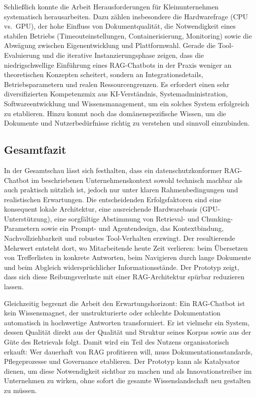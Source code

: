 Schließlich konnte die Arbeit Herausforderungen für Kleinunternehmen systematisch herausarbeiten.
Dazu zählen insbesondere die Hardwarefrage (CPU vs.\ GPU), der hohe Einfluss von Dokumentqualität, die Notwendigkeit eines stabilen Betriebs (Timeouteinstellungen, Containerisierung, Monitoring) sowie die Abwägung zwischen Eigenentwicklung und Plattformwahl.
Gerade die Tool-Evaluierung und die iterative Instanzierungsphase zeigen, dass die \glqq niedrigschwellige\grqq{} Einführung eines RAG-Chatbots in der Praxis weniger an theoretischen Konzepten scheitert, sondern an Integrationsdetails, Betriebsparametern und realen Ressourcengrenzen.
Es erfordert einen sehr diversifizierten Kompetenzmix aus KI-Verständnis, Systemadministration, Softwareentwicklung und Wissensmanagement, um ein solches System erfolgreich zu etablieren.
Hinzu kommt noch das domänenspezifische Wissen, um die Dokumente und Nutzerbedürfnisse richtig zu verstehen und sinnvoll einzubinden.

\subsection{Gesamtfazit}\label{subsec:gesamtfazit}

In der Gesamtschau lässt sich festhalten, dass ein datenschutzkonformer RAG-Chatbot im beschriebenen Unternehmenskontext sowohl technisch machbar als auch praktisch nützlich ist, jedoch nur unter klaren Rahmenbedingungen und realistischen Erwartungen.
Die entscheidenden Erfolgsfaktoren sind eine konsequent lokale Architektur, eine ausreichende Hardwarebasis (GPU-Unterstützung), eine sorgfältige Abstimmung von Retrieval- und Chunking-Parametern sowie ein Prompt- und Agentendesign, das Kontextbindung, Nachvollziehbarkeit und robustes Tool-Verhalten erzwingt.
Der resultierende Mehrwert entsteht dort, wo Mitarbeitende heute Zeit verlieren: beim Übersetzen von Trefferlisten in konkrete Antworten, beim Navigieren durch lange Dokumente und beim Abgleich widersprüchlicher Informationsstände.
Der Prototyp zeigt, dass sich diese Reibungsverluste mit einer RAG-Architektur spürbar reduzieren lassen.

Gleichzeitig begrenzt die Arbeit den Erwartungshorizont:
Ein RAG-Chatbot ist kein \glqq Wissensmagnet\grqq{}, der unstrukturierte oder schlechte Dokumentation automatisch in hochwertige Antworten transformiert.
Er ist vielmehr ein System, dessen Qualität direkt aus der Qualität und Struktur seines Korpus sowie aus der Güte des Retrievals folgt.
Damit wird ein Teil des Nutzens organisatorisch erkauft: Wer dauerhaft von RAG profitieren will, muss Dokumentationsstandards, Pflegeprozesse und Governance etablieren.
Der Prototyp kann als Katalysator dienen, um diese Notwendigkeit sichtbar zu machen und als Innovationstreiber im Unternehmen zu wirken, ohne sofort die gesamte Wissenslandschaft neu gestalten zu müssen.

